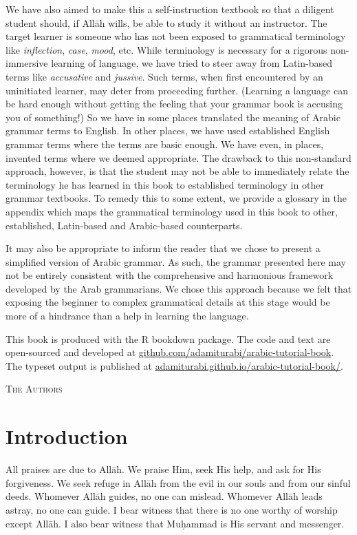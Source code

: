 \documentclass[
  10pt,
]{book}
\begin{document}
We have also aimed to make this a self-instruction textbook so that a diligent student should, if Allāh wills, be able to study it without an instructor. The target learner is someone who has not been exposed to grammatical terminology like \emph{inflection}, \emph{case}, \emph{mood}, etc. While terminology is necessary for a rigorous non-immersive learning of language, we have tried to steer away from Latin-based terms like \emph{accusative} and \emph{jussive}. Such terms, when first encountered by an uninitiated learner, may deter from proceeding further. (Learning a language can be hard enough without getting the feeling that your grammar book is accusing you of something!) So we have in some places translated the meaning of Arabic grammar terms to English. In other places, we have used established English grammar terms where the terms are basic enough. We have even, in places, invented terms where we deemed appropriate. The drawback to this non-standard approach, however, is that the student may not be able to immediately relate the terminology he has learned in this book to established terminology in other grammar textbooks. To remedy this to some extent, we provide a glossary in the appendix which maps the grammatical terminology used in this book to other, established, Latin-based and Arabic-based counterparts.

It may also be appropriate to inform the reader that we chose to present a simplified version of Arabic grammar. As such, the grammar presented here may not be entirely consistent with the comprehensive and harmonious framework developed by the Arab grammarians. We chose this approach because we felt that exposing the beginner to complex grammatical details at this stage would be more of a hindrance than a help in learning the language.

This book is produced with the R bookdown package. The code and text are open-sourced and developed at
\href{https://github.com/adamiturabi/arabic-tutorial-book}{github.com/adamiturabi/arabic-tutorial-book}.
The typeset output is published at
\href{https://adamiturabi.github.io/arabic-tutorial-book/}{adamiturabi.github.io/arabic-tutorial-book/}.

\textsc{The Authors}

\chapter{Introduction}\label{introduction}

All praises are due to Allāh. We praise Him, seek His help, and ask for His forgiveness. We seek refuge in Allāh from the evil in our souls and from our sinful deeds. Whomever Allāh guides, no one can mislead. Whomever Allāh leads astray, no one can guide. I bear witness that there is no one worthy of worship except Allāh. I also bear witness that Muḥammad is His servant and messenger.
\end{document}
